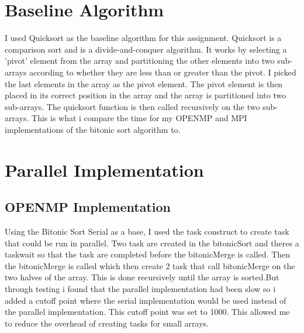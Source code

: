 \section{Baseline Algorithm}
I used Quicksort as the baseline algorithm for this assignment. Quicksort is a
comparison sort and is a divide-and-conquer algorithm. It works by selecting a
'pivot' element from the array and partitioning the other elements into two
sub-arrays according to whether they are less than or greater than the pivot. I
picked the last elements in the array as the pivot element. The pivot element
is then placed in its correct position in the array and the array is
partitioned into two sub-arrays. The quicksort function is then called
recursively on the two sub-arrays.
This is what i compare the time for my OPENMP and MPI implementations of the
bitonic sort algorithm to.

\section{Parallel Implementation}

\subsection{OPENMP Implementation}
Using the Bitonic Sort Serial as a base, I used the task construct to create
task that could be run in parallel. Two task are created in the bitonicSort and
theres a taskwait so that the task are completed before the bitonicMerge is
called. Then the bitonicMerge is called which then create 2 task that call
bitonicMerge on the two halves of the array. This is done recursively until the
array is sorted.But through testing i found that the parallel implementation
had been slow so i added a cutoff point where the serial implementation would
be used instead of the parallel implementation. This cutoff point was set to
1000. This allowed me to reduce the overhead of creating tasks for small
arrays.

